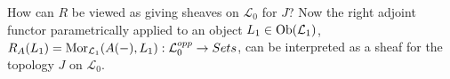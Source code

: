 \begin{frame}
\begin{block}{How can $R$ be viewed as giving sheaves on $\mathcal{L}_0$ for $J$?}
Now the right adjoint functor parametrically applied to an object $L_1 \in \mathop{\rm Ob}\nolimits(\mathcal{L}_1)$, $R_A(L_1) = \mathop{\rm Mor}\nolimits_{\mathcal{L}_1}(A(-),L_1): \mathcal{L}_0^{opp} \rightarrow Sets$, can be interpreted as a sheaf for the topology $J$ on $\mathcal{L}_0$.
\end{block}
\end{frame}